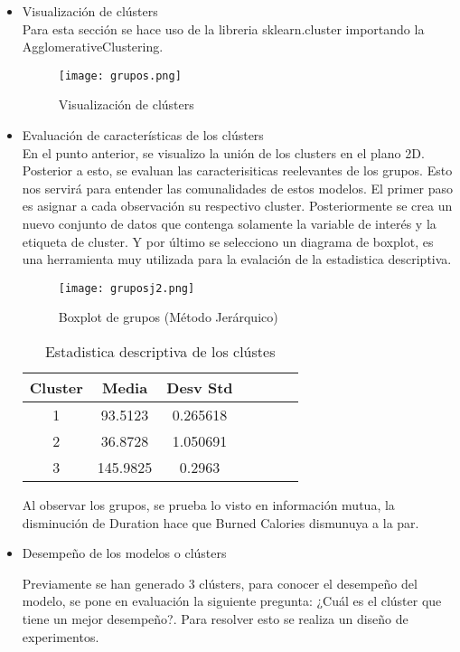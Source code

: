 \documentclass[5p,times,authoryear]{sciarticle}
\begin{document}
\begin{multicols}{2}
{\begin{itemize}
\item Visualización de clústers\\
Para esta sección se hace uso de la libreria sklearn.cluster importando la AgglomerativeClustering.
\begin{figure}[H]
\centering
  \texttt{[image: grupos.png]}\\
  \caption{Visualización de clústers}\label{fig1}
\end{figure}
\item Evaluación de características de los clústers\\
En el punto anterior, se visualizo la unión de los clusters en el plano 2D. Posterior a esto, se evaluan las caracterisiticas reelevantes de los grupos. Esto nos servirá para entender las comunalidades de estos modelos.
El primer paso es asignar a cada observación su respectivo cluster. Posteriormente se crea un nuevo conjunto de datos que contenga solamente la variable de interés y la etiqueta de cluster. Y por último se selecciono un diagrama de boxplot, es una herramienta muy utilizada para la evalación de la estadistica descriptiva.
\begin{figure}[H]
\centering
  \texttt{[image: gruposj2.png]}\\
  \caption{Boxplot de grupos (Método Jerárquico) }\label{fig1}
\end{figure}
\begin{table}[H]
\centering
         \caption{Estadistica descriptiva de los clústes}
        \label{tab:correlacion}
    \begin{tabular}{c|cccccc}
Cluster & Media & Desv Std \\
\hline
1 & 93.5123 & 0.265618  \\
2 & 36.8728 & 1.050691  \\
3 & 145.9825 & 0.2963 \\
\hline
    \end{tabular}
\end{table}

Al observar los grupos, se prueba lo visto en información mutua, la disminución de Duration hace que Burned Calories dismunuya a la par.

\item Desempeño de los modelos o clústers

Previamente se han generado 3 clústers, para conocer el desempeño del modelo, se pone en evaluación la siguiente pregunta: ¿Cuál es el clúster que tiene un mejor desempeño?. Para resolver esto se realiza un diseño de experimentos. 


\end{itemize}}
\end{multicols}
\end{document}
